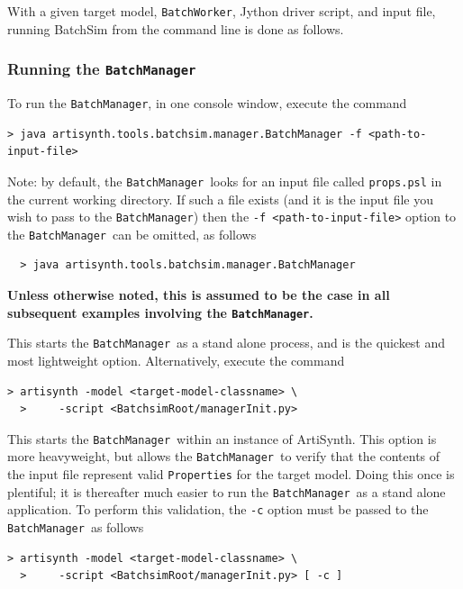 \documentclass{article}
\newcommand{\BM}{{\tt BatchManager}}
\newcommand{\BW}{{\tt BatchWorker}}
\begin{document}
With a given target model, \BW, Jython driver script, and input file, running BatchSim from the command line is done as follows.

\subsubsection{Running the \BM}
\label{run:bm}

To run the \BM, in one console window, execute the command

\begin{lstlisting}[]
  > java artisynth.tools.batchsim.manager.BatchManager -f <path-to-input-file>
\end{lstlisting}

\begin{sideblock}
Note: by default, the \BM\ looks for an input file called {\tt props.psl} in the current working directory. If such a file exists (and it is the input file you wish to pass to the \BM) then the {\tt -f~<path-to-input-file>} option to the \BM\ can be omitted, as follows
\begin{verbatim}
  > java artisynth.tools.batchsim.manager.BatchManager
\end{verbatim}
\textbf{Unless otherwise noted, this is assumed to be the case in all subsequent examples involving the \BM.}
\end{sideblock}

This starts the \BM\ as a stand alone process, and is the quickest and most lightweight option. Alternatively, execute the command

\begin{lstlisting}[]
  > artisynth -model <target-model-classname> \
  >     -script <BatchsimRoot/managerInit.py>
\end{lstlisting}

This starts the \BM\ within an instance of ArtiSynth. This option is more heavyweight, but allows the \BM\ to verify that the contents of the input file represent valid {\tt Properties} for the target model. Doing this once is plentiful; it is thereafter much easier to run the \BM\ as a stand alone application. To perform this validation, the {\tt -c} option must be passed to the \BM\ as follows

\begin{lstlisting}[]
  > artisynth -model <target-model-classname> \
  >     -script <BatchsimRoot/managerInit.py> [ -c ]
\end{lstlisting}
\end{document}
